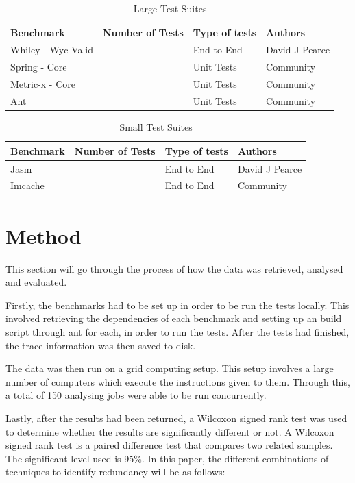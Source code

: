 \begin{table}[]
\centering
\caption{Large Test Suites}
\label{large_test}
\begin{tabular}{|l|l|l|l|}
\hline
{\bf Benchmark}       &  {\bf Number of Tests} & {\bf Type of tests} & {\bf Authors}   \\ \hline
Whiley - Wyc Valid         &       &    End to End      & David J Pearce          \\ \hline
Spring - Core   &       &    Unit Tests      & Community \\ \hline
Metric-x - Core &       &    Unit Tests      & Community \\ \hline
Ant             &       &    Unit Tests      & Community \\ \hline
\end{tabular}
\end{table}

\begin{table}[]
\centering
\caption{Small Test Suites}
\label{small_test}
\begin{tabular}{|l|l|l|l|}
\hline
{\bf Benchmark}   & {\bf Number of Tests} & {\bf Type of tests} & {\bf Authors}  \\ \hline
Jasm              &             &    End to End      & David J Pearce \\ \hline
Imcache &           &    End to End        & Community \\ \hline
\end{tabular}
\end{table}

\section{Method}

This section will go through the process of how the data was retrieved, analysed and evaluated.

Firstly, the benchmarks had to be set up in order to be run the tests locally. This involved retrieving the dependencies of each benchmark and setting up an build script through ant for each, in order to run the tests. After the tests had finished, the trace information was then saved to disk.

The data was then run on a grid computing setup. This setup involves a large number of computers which execute the instructions given to them. Through this, a total of 150 analysing jobs were able to be run concurrently.

Lastly, after the results had been returned, a Wilcoxon signed rank test was used to determine whether the results are significantly different or not. A Wilcoxon signed rank test is a paired difference test that compares two related samples. The significant level used is 95\%. In this paper, the different combinations of techniques to identify redundancy will be as follows:


